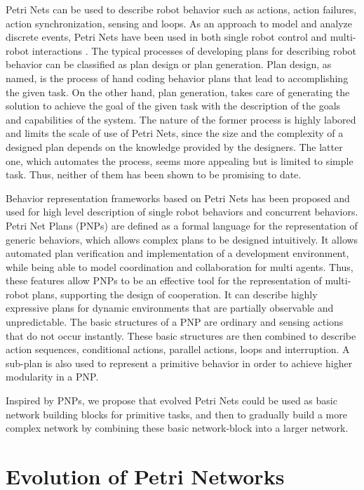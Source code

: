 \documentclass[12pt,a4paper,twocolumn]{article}
\begin{document}
Petri Nets can be used to describe robot behavior such as actions, action failures, action synchronization, sensing and loops. As an approach to model and analyze discrete events, Petri Nets have been used in both single robot control \cite{costelha2007modelling} and multi-robot interactions \cite{sheng2005peer}\cite{palamara2009teamwork}. The typical processes of developing plans for describing robot behavior can be classified as plan design or plan generation. Plan design, as named, is the process of hand coding behavior plans that lead to accomplishing the given task. On the other hand, plan generation, takes care of generating the solution to achieve the goal of the given task with the description of the goals and capabilities of the system. The nature of the former process is highly labored and limits the scale of use of Petri Nets, since the size and the complexity of a designed plan depends on the knowledge provided by the designers. The latter one, which automates the process, seems more appealing but is limited to simple task. Thus, neither of them has been shown to be promising to date. 

Behavior representation frameworks based on Petri Nets \cite{ziparo2011petri} has been proposed and used for high level description of single robot behaviors and concurrent behaviors. Petri Net Plans (PNPs) \cite{ziparo2011petri} are defined as a formal language for the representation of generic behaviors, which allows complex plans to be designed intuitively. It allows automated plan verification and implementation of a development environment, while being able to model coordination and collaboration for multi agents. Thus, these features allow PNPs to be an effective tool for the representation of multi-robot plans, supporting the design of cooperation. It can describe highly expressive plans for dynamic environments that are partially observable and unpredictable. The basic structures of a PNP are ordinary and sensing actions that do not occur instantly. These basic structures are then combined to describe action sequences, conditional actions, parallel actions, loops and interruption. A sub-plan is also used to represent a primitive behavior in order to achieve higher modularity in a PNP. 

Inspired by PNPs, we propose that evolved Petri Nets could be used as basic network building blocks for primitive tasks, and then to gradually build a more complex network by combining these basic network-block into a larger network.  

\section{Evolution of Petri Networks}
\end{document}
